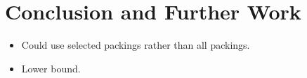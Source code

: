 \documentclass[authoryear]{elsarticle}
\begin{document}
\section{Conclusion and Further Work}
\label{sec:conclusion}
{\color{myPurple}
\begin{itemize}[leftmargin=*]
	\item Could use selected packings rather than all packings.
	\item Lower bound.
\end{itemize}
}

\begin{comment}
\section{Checklist}
{\color{myAqua}
\begin{itemize}[leftmargin=*]
	\item Vicinal \emph{sum} constraint, not vicinal \emph{score} constraint.
	\item All dashes $'$ not '. 
	\item Abbreviations (SCPP, SubSCP, AHC etc.) spelling and being used correctly.
	\item Figure and table captions.
	\item Check that correct figures are being referred to in text.
	\item Name of entire process EAX?
	\item Zenodo links DOI.
	\item State specification of computers used for experiments.
	\item Section and subsection titles, capitalisation and spelling.
	\item All figures have same line thickness, dashed line density and thickness, label size, vertex size, and colour (use tikz colours \texttt{tRed} and \texttt{tBlue}).
	\item All figures aligned correctly, subfigures aligned so that the captions are level.
	\item \texttt{$\backslash$noindent} only used when required, after equations, check if needed after definitions/figures/tables etc.
	\item Equations referenced using \texttt{$\backslash$eqref}, not \texttt{$\backslash$ref}.
	\item Tilde $\sim$ before all \texttt{$\backslash$ref} and \texttt{$\backslash$eqref}.

\end{comment}
\end{document}

